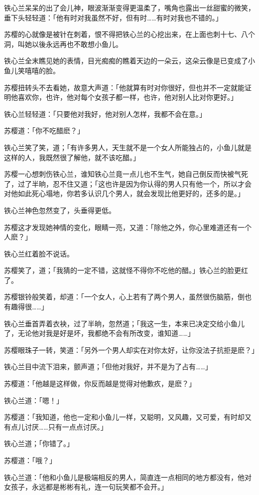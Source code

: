 \documentclass[12pt,oneside]{book}
\begin{document}
铁心兰呆呆的出了会儿神，眼波渐渐变得更温柔了，嘴角也露出一丝甜蜜的微笑，垂下头轻轻道：「他有时对我虽然不好，但有时\ldots\ldots 有时对我也不错的。」

苏樱的心就像是被针在刺着，恨不得把铁心兰的心挖出来，在上面也刺十七、八个洞，叫她以後永远再也不敢想小鱼儿。

铁心兰全末瞧见她的表情，目光痴痴的瞧着天边的一朵云，这朵云像是已变成了小鱼儿笑嘻嘻的脸。

苏樱扭转头不去看她，故意大声道：「他就算有时对你很好，但也并不一定就能证明他喜欢你，也许，他对每个女孩子都一样，也许，他对别人比对你更好。」

铁心兰轻轻道：「只要他对我好，他对别人怎样，我都不会在意。」

苏樱道：「你不吃醋麽？」

铁心兰笑了笑，道；「有许多男人，天生就不是一个女人所能独占的，小鱼儿就是这样的人，我既然很了解他，就不该吃醋。」

苏樱一心想刺伤铁心兰，谁知铁心兰竟一点儿也不生气，她自己倒反而快被气死了，过了半晌，忍不住又道；「这也许是因为你认得的男人只有他一个，所以才会对他如此死心塌地，你若多认识几个男人，就会发现比他更好的，还多的是。」

铁心兰神色忽然变了，头垂得更低。

苏樱这才发现她神情的变化，眼睛一亮，又道：「除他之外，你心里难道还有一个人麽？」

铁心兰红着脸不说话。

苏樱笑了，道；「我猜的一定不错，这就怪不得你不吃他的醋。」铁心兰的脸更红了。

苏樱银铃般笑着，却道：「一个女人，心上若有了两个男人，虽然很伤脑筋，倒也有趣得很\ldots\ldots」

铁心兰垂首弄着衣袂，过了半晌，忽然道；「我这一生，本来已决定交给小鱼儿了，无论他对我是好是坏，我都绝不会有所改变，谁知道\ldots\ldots」

苏樱眼珠子一转，笑道：「另外一个男人却实在对你太好，让你没法子抗拒是麽？」

铁心兰目中流下泪来，颤声道；「但他对我好，并不是为了占有\ldots\ldots」

苏樱道：「他越是这样做，你反而越是觉得对他歉疚，是麽？」

铁心兰道：「嗯！」

苏樱道：「我知道，他也一定和小鱼儿一样，又聪明，又风趣，又可爱，有时却又有点儿讨厌\ldots\ldots 只有一点点讨厌。」

铁心兰道；「你错了。」

苏樱道：「哦？」

铁心兰道：「他和小鱼儿是极端相反的男人，简直连一点相同的地方都没有，他对女孩子，永远都是彬彬有礼，连一句玩笑都不会开。」
\end{document}
